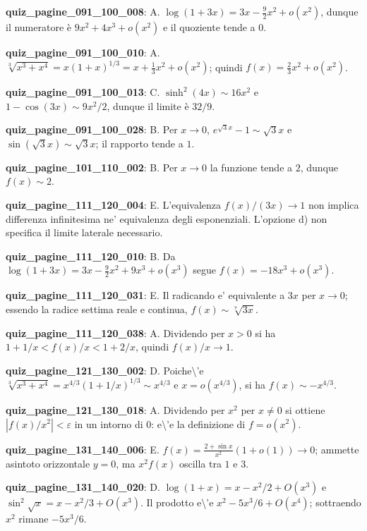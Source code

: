 \documentclass[11pt,a4paper]{article}
\newcounter{quiz}
\begin{document}
\noindent\textbf{quiz\_pagine\_091\_100\_008}: A. $\log(1+3x)=3x-\frac92x^2+o(x^2)$, dunque il numeratore è $9x^2+4x^3+o(x^2)$ e il quoziente tende a $0$.\par\medskip
\noindent\textbf{quiz\_pagine\_091\_100\_010}: A. $\sqrt[3]{x^3+x^4}=x(1+x)^{1/3}=x+\frac13x^2+o(x^2)$; quindi $f(x)=\frac23x^2+o(x^2)$.\par\medskip
\noindent\textbf{quiz\_pagine\_091\_100\_013}: C. $\sinh^2(4x)\sim16x^2$ e $1-\cos(3x)\sim9x^2/2$, dunque il limite è $32/9$.\par\medskip
\noindent\textbf{quiz\_pagine\_091\_100\_028}: B. Per $x\to0$, $e^{\sqrt3x}-1\sim\sqrt3x$ e $\sin(\sqrt3x)\sim\sqrt3x$; il rapporto tende a $1$.\par\medskip
\noindent\textbf{quiz\_pagine\_101\_110\_002}: B. Per $x\to0$ la funzione tende a $2$, dunque $f(x)\sim2$.\par\medskip
\noindent\textbf{quiz\_pagine\_111\_120\_004}: E. L'equivalenza $f(x)/(3x)\to1$ non implica differenza infinitesima ne' equivalenza degli esponenziali. L'opzione d) non specifica il limite laterale necessario.\par\medskip
\noindent\textbf{quiz\_pagine\_111\_120\_010}: B. Da $\log(1+3x)=3x-\frac92x^2+9x^3+o(x^3)$ segue $f(x)=-18x^3+o(x^3)$.\par\medskip
\noindent\textbf{quiz\_pagine\_111\_120\_031}: E. Il radicando e' equivalente a $3x$ per $x\to0$; essendo la radice settima reale e continua, $f(x)\sim\sqrt[7]{3x}$.\par\medskip
\noindent\textbf{quiz\_pagine\_111\_120\_038}: A. Dividendo per $x>0$ si ha $1+1/x<f(x)/x<1+2/x$, quindi $f(x)/x\to1$.\par\medskip
\noindent\textbf{quiz\_pagine\_121\_130\_002}: D. Poiche\textbackslash{}'e $\sqrt[3]{x^3+x^4}=x^{4/3}(1+1/x)^{1/3}\sim x^{4/3}$ e $x=o(x^{4/3})$, si ha $f(x)\sim-x^{4/3}$.\par\medskip
\noindent\textbf{quiz\_pagine\_121\_130\_018}: A. Dividendo per $x^2$ per $x\neq0$ si ottiene $|f(x)/x^2|<\varepsilon$ in un intorno di $0$: e\textbackslash{}'e la definizione di $f=o(x^2)$.\par\medskip
\noindent\textbf{quiz\_pagine\_131\_140\_006}: E. $f(x)=\frac{2+\sin x}{x^2}(1+o(1))\to0$; ammette asintoto orizzontale $y=0$, ma $x^2f(x)$ oscilla tra $1$ e $3$.\par\medskip
\noindent\textbf{quiz\_pagine\_131\_140\_020}: D. $\log(1+x)=x-x^2/2+O(x^3)$ e $\sin^2\sqrt{x}=x-x^2/3+O(x^3)$. Il prodotto e\textbackslash{}'e $x^2-5x^3/6+O(x^4)$; sottraendo $x^2$ rimane $-5x^3/6$.\par\medskip
\end{document}
